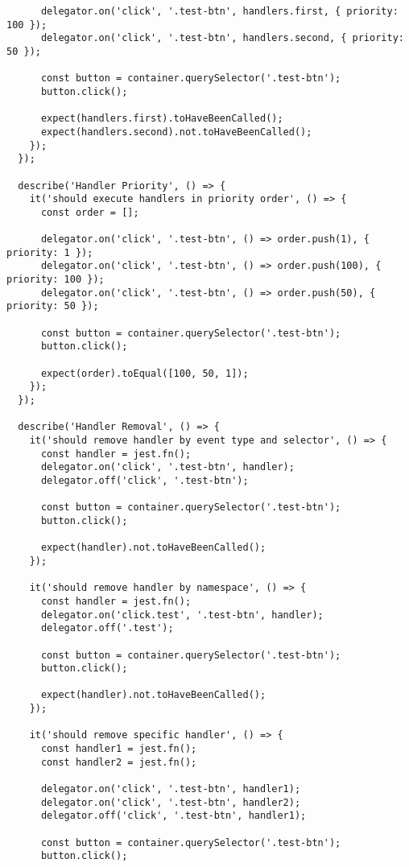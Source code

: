 \documentclass[11pt]{article}
\begin{document}
\begin{verbatim}
      delegator.on('click', '.test-btn', handlers.first, { priority: 100 });
      delegator.on('click', '.test-btn', handlers.second, { priority: 50 });
      
      const button = container.querySelector('.test-btn');
      button.click();
      
      expect(handlers.first).toHaveBeenCalled();
      expect(handlers.second).not.toHaveBeenCalled();
    });
  });
  
  describe('Handler Priority', () => {
    it('should execute handlers in priority order', () => {
      const order = [];
      
      delegator.on('click', '.test-btn', () => order.push(1), { priority: 1 });
      delegator.on('click', '.test-btn', () => order.push(100), { priority: 100 });
      delegator.on('click', '.test-btn', () => order.push(50), { priority: 50 });
      
      const button = container.querySelector('.test-btn');
      button.click();
      
      expect(order).toEqual([100, 50, 1]);
    });
  });
  
  describe('Handler Removal', () => {
    it('should remove handler by event type and selector', () => {
      const handler = jest.fn();
      delegator.on('click', '.test-btn', handler);
      delegator.off('click', '.test-btn');
      
      const button = container.querySelector('.test-btn');
      button.click();
      
      expect(handler).not.toHaveBeenCalled();
    });
    
    it('should remove handler by namespace', () => {
      const handler = jest.fn();
      delegator.on('click.test', '.test-btn', handler);
      delegator.off('.test');
      
      const button = container.querySelector('.test-btn');
      button.click();
      
      expect(handler).not.toHaveBeenCalled();
    });
    
    it('should remove specific handler', () => {
      const handler1 = jest.fn();
      const handler2 = jest.fn();
      
      delegator.on('click', '.test-btn', handler1);
      delegator.on('click', '.test-btn', handler2);
      delegator.off('click', '.test-btn', handler1);
      
      const button = container.querySelector('.test-btn');
      button.click();
      

\end{verbatim}
\end{document}
